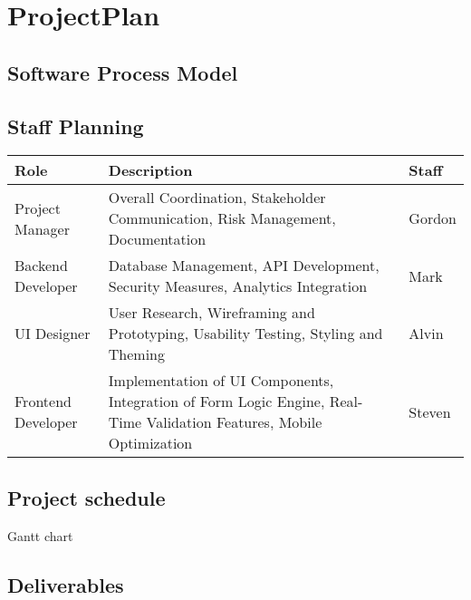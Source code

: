 \section{ProjectPlan}

\subsection{Software Process Model}
\subsection{Staff Planning}

\begin{table}[h]
    \centering
    \begin{tabularx}{\textwidth}{|l|X|l|}
    \hline
    \textbf{Role} & \textbf{Description} & \textbf{Staff} \\
    \hline
    Project Manager &
    Overall Coordination, Stakeholder Communication, Risk Management, Documentation &
    Gordon \\
    \hline
    Backend Developer &
    Database Management, API Development, Security Measures, Analytics Integration &
    Mark \\
    \hline
    UI Designer &
    User Research, Wireframing and Prototyping, Usability Testing, Styling and Theming &
    Alvin \\
    \hline
    Frontend Developer &
    Implementation of UI Components, Integration of Form Logic Engine, Real-Time Validation Features, Mobile Optimization &
    Steven \\
    \hline
    \end{tabularx}
\end{table}

\subsection{Project schedule}

Gantt chart

\subsection{Deliverables}
